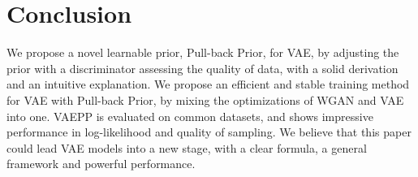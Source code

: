 \section{Conclusion}

We propose a novel learnable prior, Pull-back Prior, for VAE, by adjusting the prior with a discriminator assessing the quality of data, with a solid derivation and an intuitive explanation. We propose an efficient and stable training method for VAE with Pull-back Prior, by mixing the optimizations of WGAN and VAE into one. VAEPP is evaluated on common datasets, and shows impressive performance in log-likelihood and quality of sampling. We believe that this paper could lead VAE models into a new stage, with a clear formula, a general framework and powerful performance. 